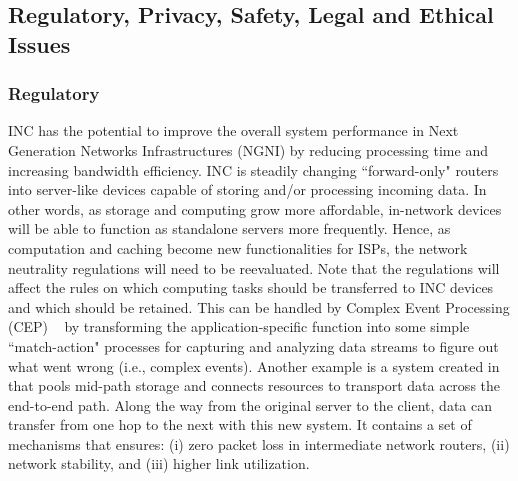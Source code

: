  \subsection{Regulatory, Privacy, Safety, Legal and Ethical Issues}
 
 \subsubsection{Regulatory}

INC has the potential to improve the overall system performance in Next Generation Networks Infrastructures (NGNI) by reducing processing time and increasing bandwidth efficiency. INC is steadily changing ``forward-only" routers into server-like devices capable of storing and/or processing incoming data. In other words, as storage and computing grow more affordable, in-network devices will be able to function as standalone servers more frequently. Hence, as computation and caching become new functionalities for ISPs, the network neutrality regulations will need to be reevaluated.  
Note that the regulations will affect the rules on which computing tasks should be transferred to INC devices and which should be retained. This can be handled by Complex Event Processing (CEP) ~\cite{9293092} by transforming the application-specific function into some simple ``match-action" processes for capturing and analyzing data streams to figure out what went wrong (i.e., complex events). Another example is a system created in \cite{9629226} that pools mid-path storage and connects resources to transport data across the end-to-end path. Along the way from the original server to the client, data can transfer from one hop to the next with this new system. It contains a set of mechanisms that ensures: (i) zero packet loss in intermediate network routers, (ii) network stability, and (iii) higher link utilization.
 
